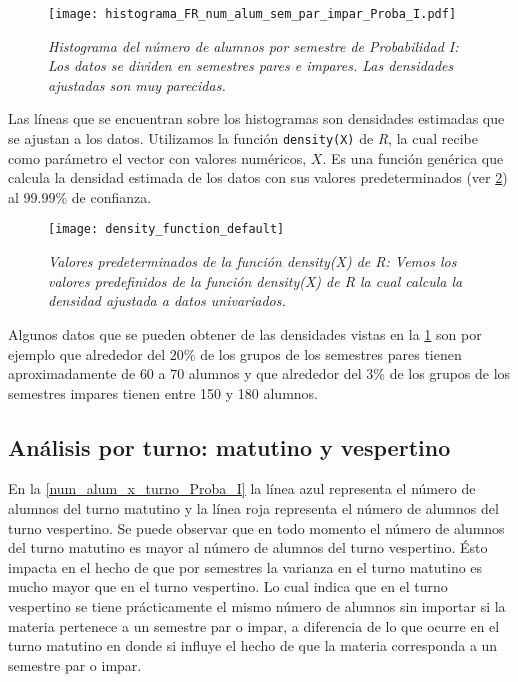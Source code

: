 \begin{figure}[H]
\centering
\texttt{[image: histograma\_FR\_num\_alum\_sem\_par\_impar\_Proba\_I.pdf]} %
\caption[\textit{Histograma del número de alumnos por semestre: Probabilidad I}]{\textit{Histograma del número de alumnos por semestre  de Probabilidad I: Los datos se dividen en semestres pares e impares. Las densidades ajustadas son muy parecidas.}}\label{HistAlumParImparProbaI}
\end{figure}

Las líneas que se encuentran sobre los histogramas son densidades estimadas que se ajustan a los datos. Utilizamos la función \verb+density(X)+ de \textit{R}, la cual recibe como parámetro el vector con valores numéricos, $X$. Es una función genérica que calcula la densidad estimada de los datos con sus valores predeterminados (ver \figurename{\ref{densityFunDefault}}) al $99.99\%$ de confianza.

\begin{figure}[H]
\centering
\texttt{[image: density\_function\_default]} %
\caption[\textit{Valores predeterminados de la función density(X) de R}]{\textit{Valores predeterminados de la función density(X) de R: Vemos los valores predefinidos de la función density(X) de R la cual calcula la densidad ajustada a datos univariados.}} \label{densityFunDefault}
\end{figure}

Algunos datos que se pueden obtener de las densidades vistas en la \figurename{\ref{HistAlumParImparProbaI}} son por ejemplo que alrededor del $20\%$ de los grupos de los semestres pares tienen aproximadamente de $60$ a $70$ alumnos y que alrededor del $3\%$ de los grupos de los semestres impares tienen entre 150 y 180 alumnos.



\subsection{Análisis por turno: matutino y vespertino}

En la \figurename{\ref{num_alum_x_turno_Proba_I}} la línea azul representa el número de alumnos del turno matutino y la línea roja representa el número de alumnos del turno vespertino. Se puede observar que en todo momento el número de alumnos del turno matutino es mayor al número de alumnos del turno vespertino. Ésto impacta en el hecho de que por semestres la varianza en el turno matutino es mucho mayor que en el turno vespertino. Lo cual indica que en el turno vespertino se tiene prácticamente el mismo número de alumnos sin importar si la materia pertenece a un semestre par o impar, a diferencia de lo que ocurre en el turno matutino en donde si influye el hecho de que la materia corresponda a un semestre par o impar.


